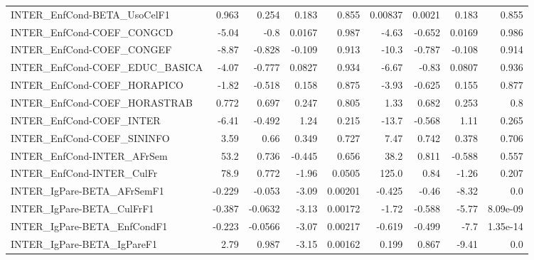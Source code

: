 \begin{tabular}{lrrrrrrrr}
INTER\_EnfCond-BETA\_UsoCelF1           &       0.963 &        0.254 &    0.183 &    0.855 &    0.00837 &      0.0021 &        0.183 &         0.855 \\
INTER\_EnfCond-COEF\_CONGCD             &       -5.04 &         -0.8 &   0.0167 &    0.987 &      -4.63 &      -0.652 &       0.0169 &         0.986 \\
INTER\_EnfCond-COEF\_CONGEF             &       -8.87 &       -0.828 &   -0.109 &    0.913 &      -10.3 &      -0.787 &       -0.108 &         0.914 \\
INTER\_EnfCond-COEF\_EDUC\_BASICA        &       -4.07 &       -0.777 &   0.0827 &    0.934 &      -6.67 &       -0.83 &       0.0807 &         0.936 \\
INTER\_EnfCond-COEF\_HORAPICO           &       -1.82 &       -0.518 &    0.158 &    0.875 &      -3.93 &      -0.625 &        0.155 &         0.877 \\
INTER\_EnfCond-COEF\_HORASTRAB          &       0.772 &        0.697 &    0.247 &    0.805 &       1.33 &       0.682 &        0.253 &           0.8 \\
INTER\_EnfCond-COEF\_INTER              &       -6.41 &       -0.492 &     1.24 &    0.215 &      -13.7 &      -0.568 &         1.11 &         0.265 \\
INTER\_EnfCond-COEF\_SININFO            &        3.59 &         0.66 &    0.349 &    0.727 &       7.47 &       0.742 &        0.378 &         0.706 \\
INTER\_EnfCond-INTER\_AFrSem            &        53.2 &        0.736 &   -0.445 &    0.656 &       38.2 &       0.811 &       -0.588 &         0.557 \\
INTER\_EnfCond-INTER\_CulFr             &        78.9 &        0.772 &    -1.96 &   0.0505 &      125.0 &        0.84 &        -1.26 &         0.207 \\
INTER\_IgPare-BETA\_AFrSemF1            &      -0.229 &       -0.053 &    -3.09 &  0.00201 &     -0.425 &       -0.46 &        -8.32 &           0.0 \\
INTER\_IgPare-BETA\_CulFrF1             &      -0.387 &      -0.0632 &    -3.13 &  0.00172 &      -1.72 &      -0.588 &        -5.77 &      8.09e-09 \\
INTER\_IgPare-BETA\_EnfCondF1           &      -0.223 &      -0.0566 &    -3.07 &  0.00217 &     -0.619 &      -0.499 &         -7.7 &      1.35e-14 \\
INTER\_IgPare-BETA\_IgPareF1            &        2.79 &        0.987 &    -3.15 &  0.00162 &      0.199 &       0.867 &        -9.41 &           0.0 \\

\end{tabular}
